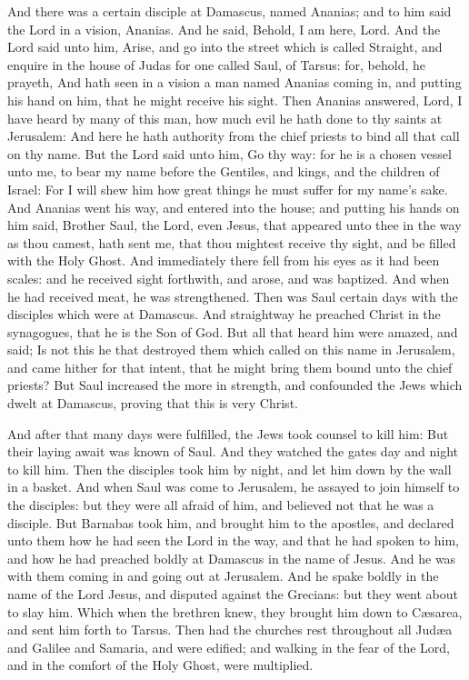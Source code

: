  And there was a certain disciple at Damascus, named
Ananias; and to him said the Lord in a vision, Ananias. And he said,
Behold, I am here, Lord.  And the Lord said unto him,
Arise, and go into the street which is called Straight, and enquire in
the house of Judas for one called Saul, of Tarsus: for, behold, he
prayeth,  And hath seen in a vision a man named Ananias
coming in, and putting his hand on him, that he might receive his sight.
 Then Ananias answered, Lord, I have heard by many of
this man, how much evil he hath done to thy saints at Jerusalem:
 And here he hath authority from the chief priests to
bind all that call on thy name.  But the Lord said unto
him, Go thy way: for he is a chosen vessel unto me, to bear my name
before the Gentiles, and kings, and the children of Israel:
 For I will shew him how great things he must suffer for
my name's sake.  And Ananias went his way, and entered
into the house; and putting his hands on him said, Brother Saul, the
Lord, even Jesus, that appeared unto thee in the way as thou camest,
hath sent me, that thou mightest receive thy sight, and be filled with
the Holy Ghost.  And immediately there fell from his eyes
as it had been scales: and he received sight forthwith, and arose, and
was baptized.  And when he had received meat, he was
strengthened. Then was Saul certain days with the disciples which were
at Damascus.  And straightway he preached Christ in the
synagogues, that he is the Son of God.  But all that
heard him were amazed, and said; Is not this he that destroyed them
which called on this name in Jerusalem, and came hither for that intent,
that he might bring them bound unto the chief priests? 
But Saul increased the more in strength, and confounded the Jews which
dwelt at Damascus, proving that this is very Christ.

 And after that many days were fulfilled, the Jews took
counsel to kill him:  But their laying await was known of
Saul. And they watched the gates day and night to kill him.
 Then the disciples took him by night, and let him down
by the wall in a basket.  And when Saul was come to
Jerusalem, he assayed to join himself to the disciples: but they were
all afraid of him, and believed not that he was a disciple.
 But Barnabas took him, and brought him to the apostles,
and declared unto them how he had seen the Lord in the way, and that he
had spoken to him, and how he had preached boldly at Damascus in the
name of Jesus.  And he was with them coming in and going
out at Jerusalem.  And he spake boldly in the name of the
Lord Jesus, and disputed against the Grecians: but they went about to
slay him.  Which when the brethren knew, they brought him
down to Cæsarea, and sent him forth to Tarsus.  Then had
the churches rest throughout all Judæa and Galilee and Samaria, and were
edified; and walking in the fear of the Lord, and in the comfort of the
Holy Ghost, were multiplied.


